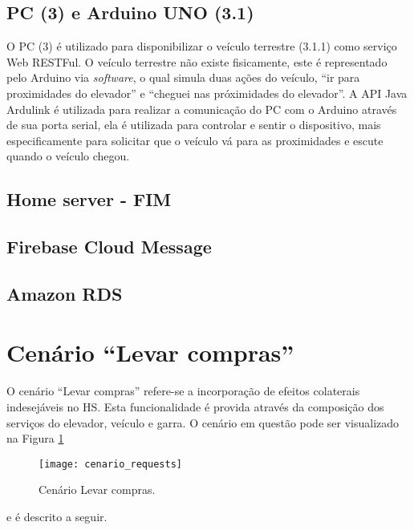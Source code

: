 \subsection{PC (3) e Arduino UNO (3.1)}
\label{subsec:pcarduino}
O PC (3) é utilizado para disponibilizar o veículo terrestre (3.1.1) como serviço Web RESTFul. O veículo terrestre não existe fisicamente, este é representado pelo Arduino via \textit{software}, o qual simula duas ações do veículo, ``ir para proximidades do elevador'' e ``cheguei nas próximidades do elevador''. A API Java Ardulink\footnotemark {} é utilizada para realizar a comunicação do PC com o Arduino através de sua porta serial, ela é utilizada para controlar e sentir o dispositivo, mais especificamente para solicitar que o veículo vá para as proximidades e escute quando o veículo chegou.

\subsection{Home server - FIM}
\label{subsec:hsfim}

\subsection{Firebase Cloud Message}
\label{subsec:fireb}

\subsection{Amazon RDS}
\label{subsec:rds}
 
\section{Cenário ``Levar compras''}
\label{sec:cenario}
O cenário ``Levar compras'' refere-se a incorporação de efeitos colaterais indesejáveis no HS. Esta funcionalidade é provida através da composição dos serviços do elevador, veículo e garra. O cenário em questão pode ser visualizado na Figura \ref{fig:cenario} 
\begin{figure}[!htb] \centering 
  \centering
  \texttt{[image: cenario\_requests]} 
  \caption{Cenário Levar compras.} 
  \label{fig:cenario}
\end{figure} e é descrito a seguir.

